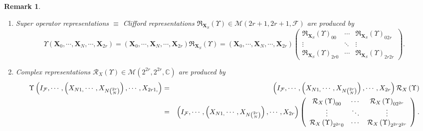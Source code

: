 \documentclass[aps,preprint]{revtex4}
\newtheorem{remark}[theorem]{Remark}
\begin{document}
\begin{remark}
\begin{enumerate}
\item Super operator representations $\equiv $ Clifford representations $%
\mathfrak{R}_{\boldsymbol{X}_{S}}\left( \Upsilon \right) \in \mathcal{M}%
\left( 2r+1,2r+1,\mathcal{F}\right) $ are produced by 
\begin{equation}
\Upsilon \left( \boldsymbol{X}_{0},\cdots ,\boldsymbol{X}_{N},\cdots ,%
\boldsymbol{X}_{2r}\right) =\left( \boldsymbol{X}_{0},\cdots ,\boldsymbol{X}%
_{N},\cdots ,\boldsymbol{X}_{2r}\right) \mathfrak{R}_{\boldsymbol{X}%
_{S}}\left( \Upsilon \right) =\left( \boldsymbol{X}_{0},\cdots ,\boldsymbol{X%
}_{N},\cdots ,\boldsymbol{X}_{2r}\right) \left( 
\begin{array}{ccc}
\mathfrak{R}_{\boldsymbol{X}_{S}}\left( \Upsilon \right) _{00} & \cdots & 
\mathfrak{R}_{\boldsymbol{X}_{S}}\left( \Upsilon \right) _{02r} \\ 
\vdots & \ddots & \vdots \\ 
\mathfrak{R}_{\boldsymbol{X}_{S}}\left( \Upsilon \right) _{2r0} & \cdots & 
\mathfrak{R}_{\boldsymbol{X}_{S}}\left( \Upsilon \right) _{2r2r}%
\end{array}%
\right) .
\end{equation}

\item Complex representations $\mathcal{R}_{X}\left( \Upsilon \right) \in 
\mathcal{M}\left( 2^{2r},2^{2r},\mathbb{C}\right) $ are produced by 
\begin{eqnarray}
\Upsilon \left( I_{\mathcal{F}},\cdots ,\left( X_{N1,}\cdots ,X_{N\binom{2r}{%
N}}\right) ,\cdots ,X_{2r1,}\right) &=&\left( I_{\mathcal{F}},\cdots ,\left(
X_{N1,}\cdots ,X_{N\binom{2r}{N}}\right) ,\cdots ,X_{2r}\right) \mathcal{R}%
_{X}\left( \Upsilon \right) \\
&=&\left( I_{\mathcal{F}},\cdots ,\left( X_{N1,}\cdots ,X_{N\binom{2r}{N}%
}\right) ,\cdots ,X_{2r}\right) \left( 
\begin{array}{ccc}
\mathcal{R}_{X}\left( \Upsilon \right) _{00} & \cdots & \mathcal{R}%
_{X}\left( \Upsilon \right) _{02^{2r}} \\ 
\vdots & \ddots & \vdots \\ 
\mathcal{R}_{X}\left( \Upsilon \right) _{2^{2r}0} & \cdots & \mathcal{R}%
_{X}\left( \Upsilon \right) _{2^{2r}2^{2r}}%
\end{array}%
\right) .
\end{eqnarray}
\end{enumerate}
\end{remark}
\end{document}
